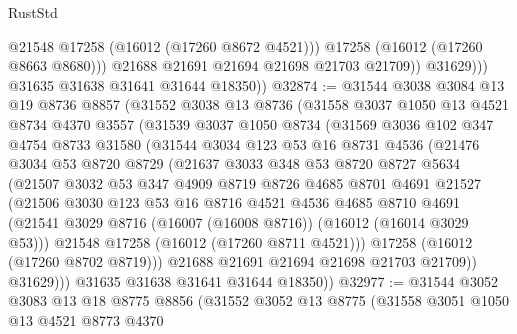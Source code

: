 \begin{lexlean}{RustStd}
\begin{coremodule}
                      @21548
                      @17258
                      (@16012 (@17260 @8672 @4521)))
                    @17258
                    (@16012 (@17260 @8663 @8680)))
                  @21688
                  @21691
                  @21694
                  @21698
                  @21703
                  @21709))
              @31629)))
        @31635
        @31638
        @31641
        @31644
        @18350))
@32874 := @31544
    @3038
    @3084
    @13
    @19
    @8736
    @8857
    (@31552
      @3038
      @13
      @8736
      (@31558
        @3037
        @1050
        @13
        @4521
        @8734
        @4370
        @3557
        (@31539
          @3037
          @1050
          @8734
          (@31569
            @3036
            @102
            @347
            @4754
            @8733
            @31580
            (@31544
              @3034
              @123
              @53
              @16
              @8731
              @4536
              (@21476
                @3034
                @53
                @8720
                @8729
                (@21637
                  @3033
                  @348
                  @53
                  @8720
                  @8727
                  @5634
                  (@21507
                    @3032
                    @53
                    @347
                    @4909
                    @8719
                    @8726
                    @4685
                    @8701
                    @4691
                    @21527
                    (@21506
                      @3030
                      @123
                      @53
                      @16
                      @8716
                      @4521
                      @4536
                      @4685
                      @8710
                      @4691
                      (@21541 @3029 @8716 (@16007 (@16008 @8716)) (@16012 (@16014 @3029 @53)))
                      @21548
                      @17258
                      (@16012 (@17260 @8711 @4521)))
                    @17258
                    (@16012 (@17260 @8702 @8719)))
                  @21688
                  @21691
                  @21694
                  @21698
                  @21703
                  @21709))
              @31629)))
        @31635
        @31638
        @31641
        @31644
        @18350))
@32977 := @31544
    @3052
    @3083
    @13
    @18
    @8775
    @8856
    (@31552
      @3052
      @13
      @8775
      (@31558
        @3051
        @1050
        @13
        @4521
        @8773
        @4370

\end{coremodule}
\end{lexlean}
